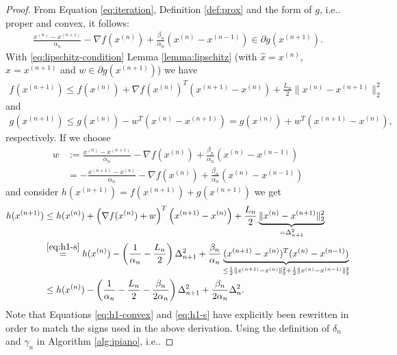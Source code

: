 \documentclass[onecolumn,final,a4paper,13pt,reqno]{siamart}
\makeatletter
\DeclareRobustCommand\onedot{\futurelet\@let@token\@onedot}
\def\@onedot{\ifx\@let@token.\else.\null\fi\xspace}
\def\ie{{i.e}\onedot} \def\Ie{{I.e}\onedot}
\makeatother
\begin{document}
\begin{proof}
	From Equation \eqref{eq:iteration}, Definition \ref{def:prox} and the form of $g$, \ie proper and convex, it follows:
	\begin{align}
		\frac{x^{(n)} - x^{(n + 1)}}{\alpha_n} - \nabla f(x^{(n)}) + \frac{\beta_n}{\alpha_n}(x^{(n)} - x^{(n - 1)}) \in \partial g(x^{(n + 1)}).
	\end{align}
	With \eqref{eq:lipschitz-condition} Lemma \ref{lemma:lipschitz} (with $\hat{x} = x^{(n)}$, $x = x^{(n + 1)}$ and $w \in \partial g(x^{(n + 1)})$) we have
	\begin{align}
		f(x^{(n + 1)}) \leq f(x^{(n)}) + \nabla f(x^{(n)})^T(x^{(n + 1)} - x^{(n)}) + \frac{L_n}{2} \|x^{(n)} - x^{(n + 1)}\|_2^2
	\end{align}
	and 
	\begin{align}
		g(x^{(n + 1)}) \leq g(x^{(n)}) - w^T (x^{(n)} - x^{(n + 1)}) = g(x^{(n)}) + w^T(x^{(n + 1)} - x^{(n)}),\label{eq:h1-convex}
	\end{align}
	respectively. If we choose
	\begin{align}
		w &:= \frac{x^{(n)} - x^{(n + 1)}}{\alpha_n} - \nabla f(x^{(n)}) + \frac{\beta_n}{\alpha_n}(x^{(n)} - x^{(n - 1)})\\
		&= - \frac{x^{(n + 1)} - x^{(n)}}{\alpha_n} - \nabla f(x^{(n)}) + \frac{\beta_n}{\alpha_n}(x^{(n)} - x^{(n - 1)})\label{eq:h1-s}
	\end{align}
	and consider $h(x^{(n + 1)}) = f(x^{(n + 1)}) + g(x^{(n + 1)})$ we get
	\begin{align}
		h(x^{(n + 1)}) &\leq h(x^{(n)}) + \left(\nabla f(x^{(n)}) + w\right)^T\left(x^{(n + 1)} - x^{(n)}\right) + \frac{L_n}{2}\underbrace{\|x^{(n)} - x^{(n + 1)}\|_2^2}_{= \Delta_{n + 1}^2}\\
		&\overset{\eqref{eq:h1-s}}{=} h(x^{(n)}) - \left(\frac{1}{\alpha_n} - \frac{L_n}{2}\right)\Delta_{n + 1}^2 + \frac{\beta_n}{\alpha_n} \underbrace{(x^{(n + 1)} - x^{(n)})^T(x^{(n)} - x^{(n - 1)})}_{\leq \frac{1}{2}\|x^{(n + 1)} - x^{(n)}\|_2^2 + \frac{1}{2}\|x^{(n)} - x^{(n - 1)}\|_2^2}\\
		&\leq h(x^{(n)}) - \left(\frac{1}{\alpha_n} - \frac{L_n}{2} - \frac{\beta_n}{2\alpha_n}\right)\Delta_{n + 1}^2 + \frac{\beta_n}{2\alpha_n} \Delta_n^2.\label{eq:h1-inequality}
	\end{align}
	Note that Equations \eqref{eq:h1-convex} and \eqref{eq:h1-s} have explicitly been rewritten in order to match the signs used in the above derivation. Using the definition of $\delta_n$ and $\gamma_n$ in Algorithm \ref{alg:ipiano}, \ie

\end{proof}
\end{document}

